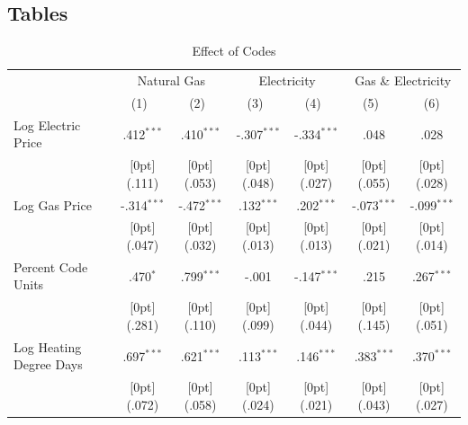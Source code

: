 \documentclass[10pt]{article}
\begin{document}
\subsection{Tables}

\begin{table}[h!]\footnotesize
\caption{Effect of Codes}
\label{main}
\begin{tabular*}{\textwidth}{@{\extracolsep{\fill}}lcccccc}	\toprule	
& \multicolumn{2}{c}{Natural Gas} &	\multicolumn{2}{c}{Electricity} &	\multicolumn{2}{c}{Gas \& Electricity} \\				
\cmidrule{2-7}						
	& \multicolumn{1}{c}{(1)\mbox{\ }} &	\multicolumn{1}{c}{(2)\mbox{\ }} &	\multicolumn{1}{c}{(3)\mbox{\ }} &	\multicolumn{1}{c}{(4)\mbox{\ }} &	\multicolumn{1}{c}{(5)\mbox{\ }} &	\multicolumn{1}{c}{(6)} \\
\midrule					
Log Electric Price &	.412$^{***}$ &	.410$^{***}$ &	-.307$^{***}$ &	-.334$^{***}$ &	.048 &	.028 \\
&	\raisebox{.7ex}[0pt]{\scriptsize (.111)} &	\raisebox{.7ex}[0pt]{\scriptsize (.053)} &	\raisebox{.7ex}[0pt]{\scriptsize (.048)} &	\raisebox{.7ex}[0pt]{\scriptsize (.027)} &	\raisebox{.7ex}[0pt]{\scriptsize (.055)} &	\raisebox{.7ex}[0pt]{\scriptsize (.028)} \\
Log Gas Price &	-.314$^{***}$ &	-.472$^{***}$ &	.132$^{***}$ &	.202$^{***}$ &	-.073$^{***}$ &	-.099$^{***}$ \\
&	\raisebox{.7ex}[0pt]{\scriptsize (.047)} &	\raisebox{.7ex}[0pt]{\scriptsize (.032)} &	\raisebox{.7ex}[0pt]{\scriptsize (.013)} &	\raisebox{.7ex}[0pt]{\scriptsize (.013)} &	\raisebox{.7ex}[0pt]{\scriptsize (.021)} &	\raisebox{.7ex}[0pt]{\scriptsize (.014)} \\
Percent Code Units &	.470$^{*}$ &	.799$^{***}$ &	-.001 &	-.147$^{***}$ &	.215 &	.267$^{***}$ \\
&	\raisebox{.7ex}[0pt]{\scriptsize (.281)} &	\raisebox{.7ex}[0pt]{\scriptsize (.110)} &	\raisebox{.7ex}[0pt]{\scriptsize (.099)} &	\raisebox{.7ex}[0pt]{\scriptsize (.044)} &	\raisebox{.7ex}[0pt]{\scriptsize (.145)} &	\raisebox{.7ex}[0pt]{\scriptsize (.051)} \\
Log Heating Degree Days &	.697$^{***}$ &	.621$^{***}$ &	.113$^{***}$ &	.146$^{***}$ &	.383$^{***}$ &	.370$^{***}$ \\
&	\raisebox{.7ex}[0pt]{\scriptsize (.072)} &	\raisebox{.7ex}[0pt]{\scriptsize (.058)} &	\raisebox{.7ex}[0pt]{\scriptsize (.024)} &	\raisebox{.7ex}[0pt]{\scriptsize (.021)} &	\raisebox{.7ex}[0pt]{\scriptsize (.043)} &	\raisebox{.7ex}[0pt]{\scriptsize (.027)} \\

\end{tabular*}
\end{table}
\end{document}
